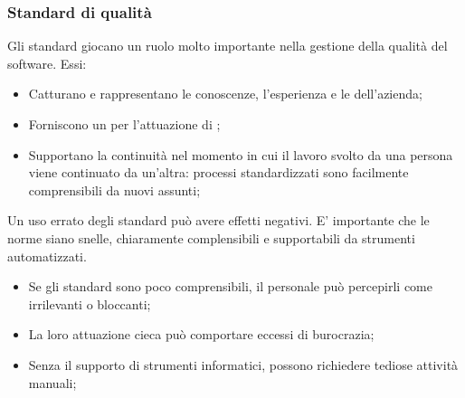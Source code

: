 \subsubsection{Standard di qualità}
Gli standard giocano un ruolo molto importante nella gestione della qualità del software. Essi:
\begin{itemize}
	\item Catturano e rappresentano le conoscenze, l'esperienza e le  dell'azienda;
	\item Forniscono un  per l'attuazione di ;
	\item Supportano la continuità nel momento in cui il lavoro svolto da una persona viene continuato da un'altra: processi standardizzati sono facilmente comprensibili da nuovi assunti;
\end{itemize}

Un uso errato degli standard può avere effetti negativi. E' importante che le norme siano snelle, chiaramente complensibili e supportabili da strumenti automatizzati.
\begin{itemize}
	\item Se gli standard sono poco comprensibili, il personale può percepirli come irrilevanti o bloccanti;
	\item La loro attuazione cieca può comportare eccessi di burocrazia;
	\item Senza il supporto di strumenti informatici, possono richiedere tediose attività manuali;
\end{itemize}

